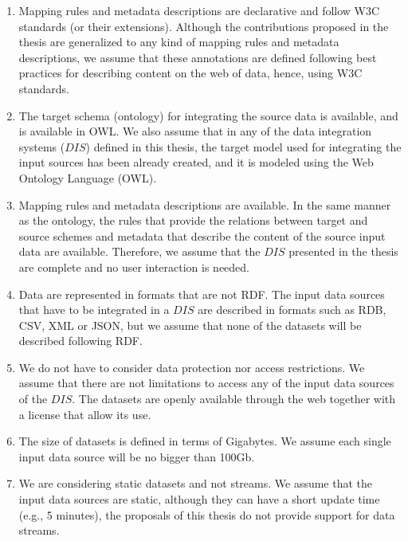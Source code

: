 \begin{enumerate}[label=\textbf{A{\arabic*}}]
    \item Mapping rules and metadata descriptions are declarative and follow W3C standards (or their extensions). Although the contributions proposed in the thesis are generalized to any kind of mapping rules and metadata descriptions, we assume that these annotations are defined following best practices for describing content on the web of data, hence, using W3C standards. 
    \item The target schema (ontology) for integrating the source data is available, and is available in OWL. We also assume that in any of the data integration systems ($DIS$) defined in this thesis, the target model used for integrating the input sources has been already created, and it is modeled using the Web Ontology Language (OWL).
    \item Mapping rules and metadata descriptions are available. In the same manner as the ontology, the rules that provide the relations between target and source schemes and metadata that describe the content of the source input data are available. Therefore, we assume that the $DIS$ presented in the thesis are complete and no user interaction is needed.
    \item Data are represented in formats that are not RDF. The input data sources that have to be integrated in a $DIS$ are described in formats such as RDB, CSV, XML or JSON, but we assume that none of the datasets will be described following RDF.
    \item We do not have to consider data protection nor access restrictions. We assume that there are not limitations to access any of the input data sources of the $DIS$. The datasets are openly available through the web together with a license that allow its use.
    \item The size of datasets is defined in terms of Gigabytes. We assume each single input data source will be no bigger than 100Gb.
    \item We are considering static datasets and not streams. We assume that the input data sources are static, although they can have a short update time (e.g., 5 minutes), the proposals of this thesis do not provide support for data streams.
\end{enumerate}

